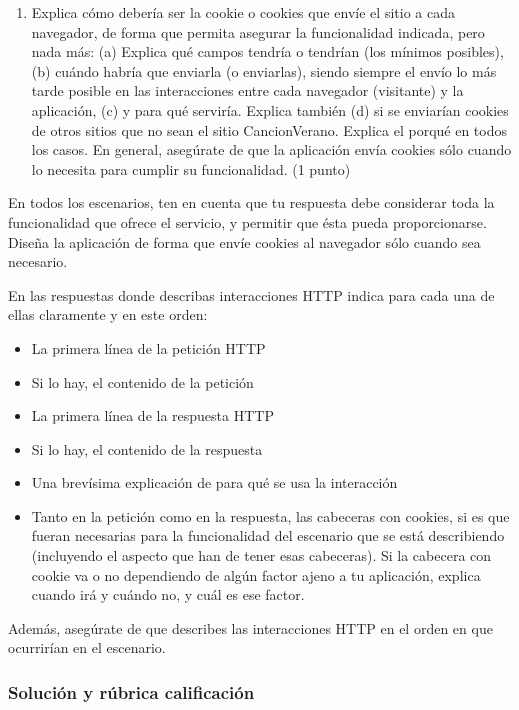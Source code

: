 \begin{enumerate}
\item Explica cómo debería ser la cookie o cookies que envíe el sitio a cada navegador, de forma que permita asegurar la funcionalidad indicada, pero nada más: (a) Explica qué campos tendría o tendrían (los mínimos posibles), (b) cuándo habría que enviarla (o enviarlas), siendo siempre el envío lo más tarde posible en las interacciones entre cada navegador (visitante) y la aplicación, (c) y para qué serviría. Explica también (d) si se enviarían cookies de otros sitios que no sean el sitio CancionVerano. Explica el porqué en todos los casos. En general, asegúrate de que la aplicación envía cookies sólo cuando lo necesita para cumplir su funcionalidad. (1 punto)
\end{enumerate}

En todos los escenarios, ten en cuenta que tu respuesta debe considerar toda la funcionalidad que ofrece el servicio, y permitir que ésta pueda proporcionarse. Diseña la aplicación de forma que envíe cookies al navegador sólo cuando sea necesario.

En las respuestas donde describas interacciones HTTP indica para cada una de ellas claramente y en este orden:
  \begin{itemize}
  \item La primera línea de la petición HTTP
  \item Si lo hay, el contenido de la petición
  \item La primera línea de la respuesta HTTP
  \item Si lo hay, el contenido de la respuesta
  \item Una brevísima explicación de para qué se usa la interacción
  \item Tanto en la petición como en la respuesta, las cabeceras con cookies, si es que fueran necesarias para la funcionalidad del escenario que se está describiendo (incluyendo el aspecto que han de tener esas cabeceras). Si la cabecera con cookie va o no dependiendo de algún factor ajeno a tu aplicación, explica cuando irá y cuándo no, y cuál es ese factor.
  \end{itemize}

Además, asegúrate de que describes las interacciones HTTP en el orden en que ocurrirían en el escenario.

\subsubsection{Solución y rúbrica calificación}

